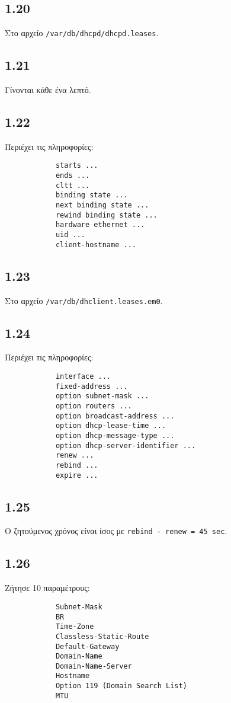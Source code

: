 \documentclass[a4paper, 12pt]{article}
\begin{document}
	\subsection*{1.20}
		Στο αρχείο \verb|/var/db/dhcpd/dhcpd.leases|.
	
	\subsection*{1.21}
		Γίνονται κάθε ένα λεπτό.
	
	\subsection*{1.22}
		Περιέχει τις πληροφορίες:
		
		\begin{verbatim}
			starts ...
			ends ...
			cltt ...
			binding state ...
			next binding state ...
			rewind binding state ...
			hardware ethernet ...
			uid ...
			client-hostname ...
		\end{verbatim}
	
	\subsection*{1.23}
		Στο αρχείο \verb|/var/db/dhclient.leases.em0|.
	
	\subsection*{1.24}
		Περιέχει τις πληροφορίες:
		
		\begin{verbatim}
			interface ...
			fixed-address ...
			option subnet-mask ...
			option routers ...
			option broadcast-address ...
			option dhcp-lease-time ...
			option dhcp-message-type ...
			option dhcp-server-identifier ...
			renew ...
			rebind ...
			expire ...
		\end{verbatim}
		
	\subsection*{1.25}
		Ο ζητούμενος χρόνος είναι ίσος με \verb|rebind - renew = 45 sec|.
	
	\subsection*{1.26}
		Ζήτησε 10 παραμέτρους:
		
		\begin{verbatim}
			Subnet-Mask
			BR
			Time-Zone
			Classless-Static-Route
			Default-Gateway
			Domain-Name
			Domain-Name-Server
			Hostname
			Option 119 (Domain Search List)
			MTU
		\end{verbatim}
	
\end{document}
